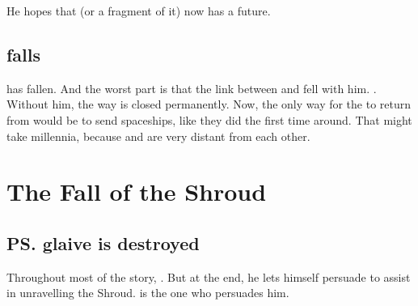 
He hopes that \Miith{} (or a fragment of it) now has a future. 












\subsection{\Daggerrain falls}
\Daggerrain{} has fallen. 
And the worst part is that the link between \Erebos{} and \Nyx{} fell with him. 
. Without him, the way is closed permanently. 
Now, the only way for the \banes{} to return from \Erebos{} would be to send spaceships, like they did the first time around. 
That might take millennia, because \Erebos{} and \Miith{} are very distant from each other. 















\section{The Fall of the Shroud}
\subsection{\ps{\Ishnaruchaefir} glaive is destroyed}
Throughout most of the story, . But at the end, he lets himself persuade to assist in unravelling the Shroud. \Triestessakhin{} is the one who persuades him. 

